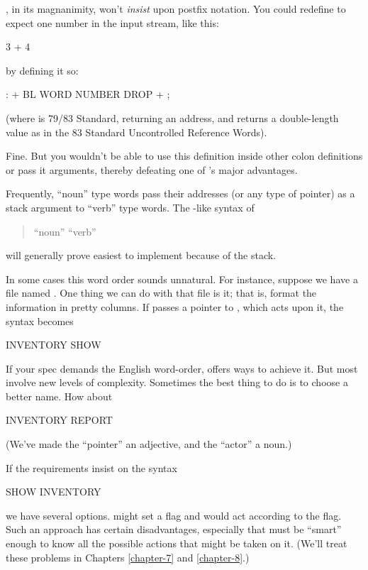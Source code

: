 \Forth{}, in its magnanimity, won't \emph{insist} upon postfix notation.
You could redefine \forth{+} to expect one number in the input stream,
like this:

\begin{Code}
3 + 4
\end{Code}
by defining it so:
\begin{Code}
: +   BL WORD  NUMBER DROP  + ;
\end{Code}
(where  is 79/83 Standard, returning an address, and
 returns a double-length value as in the 83 Standard
Uncontrolled Reference Words).

Fine. But you wouldn't be able to use this definition inside other colon
definitions or pass it arguments, thereby defeating one of \Forth{}'s
major advantages.

Frequently, ``noun'' type words pass their addresses (or any type of
pointer) as a stack argument to ``verb'' type words. The \Forth{}-like
syntax of
\begin{quote}
{\sf ``noun'' ``verb''}
\end{quote}
will generally prove easiest to implement because of the stack.\medbreak

In some cases this word order sounds
unnatural.  For instance, suppose we have a file named
. One thing we can do with that file is 
it; that is, format the information in pretty columns. If
 passes a pointer to , which acts upon
it, the syntax becomes
\begin{Code}
INVENTORY SHOW
\end{Code}
If your spec demands the English word-order,
\Forth{} offers ways to
achieve it. But most involve new levels of complexity. Sometimes the
best thing to do is to choose a better name. How about
\begin{Code}
INVENTORY REPORT
\end{Code}
(We've made the ``pointer'' an adjective, and the ``actor'' a noun.)

If the requirements insist on the syntax
\begin{Code}
SHOW INVENTORY
\end{Code}
we have several options.  might set a flag and
 would act according to the flag. Such an approach has
certain disadvantages, especially that  must be ``smart''
enough to know all the possible actions that might be taken on it. (We'll
treat these problems in Chapters \ref{chapter-7} and \ref{chapter-8}.)%


